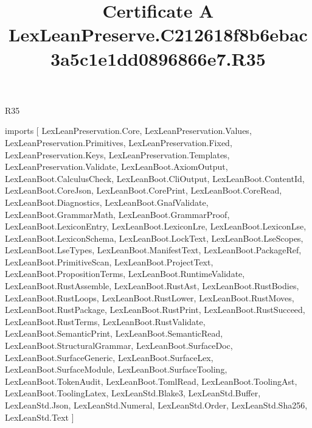 \begin{lexlean}{R35}
\title{Certificate A LexLeanPreserve.C212618f8b6ebac3a5c1e1dd0896866e7.R35}
\begin{coremodule}
imports [
  LexLeanPreservation.Core,
  LexLeanPreservation.Values,
  LexLeanPreservation.Primitives,
  LexLeanPreservation.Fixed,
  LexLeanPreservation.Keys,
  LexLeanPreservation.Templates,
  LexLeanPreservation.Validate,
  LexLeanBoot.AxiomOutput,
  LexLeanBoot.CalculusCheck,
  LexLeanBoot.CliOutput,
  LexLeanBoot.ContentId,
  LexLeanBoot.CoreJson,
  LexLeanBoot.CorePrint,
  LexLeanBoot.CoreRead,
  LexLeanBoot.Diagnostics,
  LexLeanBoot.GnafValidate,
  LexLeanBoot.GrammarMath,
  LexLeanBoot.GrammarProof,
  LexLeanBoot.LexiconEntry,
  LexLeanBoot.LexiconLre,
  LexLeanBoot.LexiconLse,
  LexLeanBoot.LexiconSchema,
  LexLeanBoot.LockText,
  LexLeanBoot.LseScopes,
  LexLeanBoot.LseTypes,
  LexLeanBoot.ManifestText,
  LexLeanBoot.PackageRef,
  LexLeanBoot.PrimitiveScan,
  LexLeanBoot.ProjectText,
  LexLeanBoot.PropositionTerms,
  LexLeanBoot.RuntimeValidate,
  LexLeanBoot.RustAssemble,
  LexLeanBoot.RustAst,
  LexLeanBoot.RustBodies,
  LexLeanBoot.RustLoops,
  LexLeanBoot.RustLower,
  LexLeanBoot.RustMoves,
  LexLeanBoot.RustPackage,
  LexLeanBoot.RustPrint,
  LexLeanBoot.RustSucceed,
  LexLeanBoot.RustTerms,
  LexLeanBoot.RustValidate,
  LexLeanBoot.SemanticPrint,
  LexLeanBoot.SemanticRead,
  LexLeanBoot.StructuralGrammar,
  LexLeanBoot.SurfaceDoc,
  LexLeanBoot.SurfaceGeneric,
  LexLeanBoot.SurfaceLex,
  LexLeanBoot.SurfaceModule,
  LexLeanBoot.SurfaceTooling,
  LexLeanBoot.TokenAudit,
  LexLeanBoot.TomlRead,
  LexLeanBoot.ToolingAst,
  LexLeanBoot.ToolingLatex,
  LexLeanStd.Blake3,
  LexLeanStd.Buffer,
  LexLeanStd.Json,
  LexLeanStd.Numeral,
  LexLeanStd.Order,
  LexLeanStd.Sha256,
  LexLeanStd.Text
]


\end{coremodule}
\end{lexlean}
